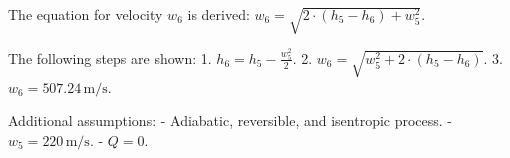 The equation for velocity \( w_6 \) is derived:  
\( w_6 = \sqrt{2 \cdot (h_5 - h_6) + w_5^2} \).  

The following steps are shown:  
1. \( h_6 = h_5 - \frac{w_5^2}{2} \).  
2. \( w_6 = \sqrt{w_5^2 + 2 \cdot (h_5 - h_6)} \).  
3. \( w_6 = 507.24 \, \text{m/s} \).  

Additional assumptions:  
- Adiabatic, reversible, and isentropic process.  
- \( w_5 = 220 \, \text{m/s} \).  
- \( Q = 0 \).